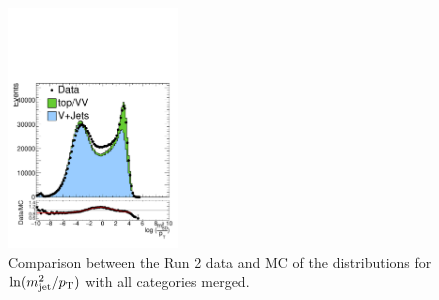 \begin{figure}[htbp]
  \centering
  \includegraphics[width=0.4\textwidth]{fig/uncertainties/logWeight.pdf}
  \caption{
    Comparison between the Run 2 data and MC of the distributions for $\ln(m_\mathrm{jet}^2/p_\mathrm{T})$ with all categories merged.
  }
  \label{fig:logWeight}
\end{figure}

